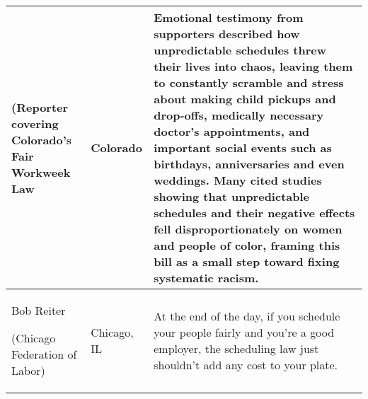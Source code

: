\begin{tabular}{>{\raggedright}p{}|>{\raggedright}p{}|>{\raggedright}p{}}
(Reporter covering Colorado\textquoteright s Fair Workweek Law  & Colorado & Emotional testimony from supporters described how unpredictable schedules
threw their lives into chaos, leaving them to constantly scramble
and stress about making child pickups and drop-offs, medically necessary
doctor's appointments, and important social events such as birthdays,
anniversaries and even weddings. Many cited studies showing that unpredictable
schedules and their negative effects fell disproportionately on women
and people of color, framing this bill as a small step toward fixing
systematic racism.\tabularnewline
\hline 
Bob Reiter 

(Chicago Federation of Labor)  & Chicago, IL & At the end of the day, if you schedule your people fairly and you\textquoteright re
a good employer, the scheduling law just shouldn\textquoteright t
add any cost to your plate. \tabularnewline
\end{tabular}
